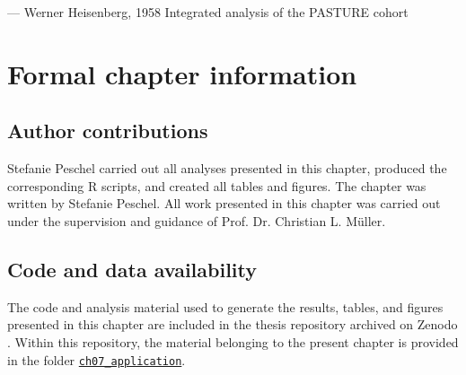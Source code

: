 
  {--- Werner Heisenberg, 1958}
  {Integrated analysis of the PASTURE cohort}
\nocite{heisenberg1958physics}
\chaptercontents

\section*{Formal chapter information}

\subsection*{Author contributions}

Stefanie Peschel carried out all analyses presented in this chapter, produced the corresponding R scripts, and created all tables and figures. The chapter was written by Stefanie Peschel. All work presented in this chapter was carried out under the supervision and guidance of Prof. Dr. Christian L. Müller.

\subsection*{Code and data availability}

The code and analysis material used to generate the results, tables, and figures presented in this chapter are included in the thesis repository archived on Zenodo \citep{Peschel2026thesisRepo}. Within this repository, the material belonging to the present chapter is provided in the folder \href{https://github.com/stefpeschel/phd_thesis/tree/main/ch07_application}{\texttt{ch07\_application}}.

